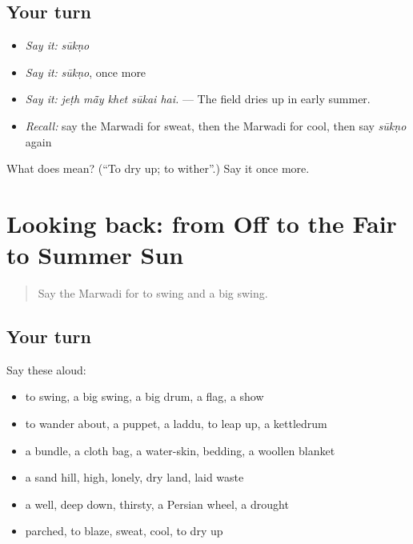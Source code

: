 \subsection*{Your turn}
\begin{itemize}
\raggedright
  \item \emph{Say it:} \emph{sūkṇo}
  \item \emph{Say it:} \emph{sūkṇo}, once more
  \item \emph{Say it:} \emph{jeṭh mā̃y khet sūkai hai.} — The field dries up in early summer.
  \item \emph{Recall:} say the Marwadi for sweat, then the Marwadi for cool, then say \emph{sūkṇo} again
\end{itemize}

\begin{tcolorbox}[breakable,colback=teal!4,colframe=teal!35!black,title={Before you move on}]
What does  mean? (\textquotedblleft{}To dry up; to wither\textquotedblright{}.) Say it once more.
\end{tcolorbox}
\section[(dialogue)]{Looking back: from Off to the Fair to Summer Sun}

\label{lesson:MW-R228-review-223-228}



\begin{quote}
Say the Marwadi for to swing and a big swing.
\end{quote}

\subsection*{Your turn}
Say these aloud:

\begin{itemize}
\raggedright
  \item to swing, a big swing, a big drum, a flag, a show
  \item to wander about, a puppet, a laddu, to leap up, a kettledrum
  \item a bundle, a cloth bag, a water-skin, bedding, a woollen blanket
  \item a sand hill, high, lonely, dry land, laid waste
  \item a well, deep down, thirsty, a Persian wheel, a drought
  \item parched, to blaze, sweat, cool, to dry up
\end{itemize}

